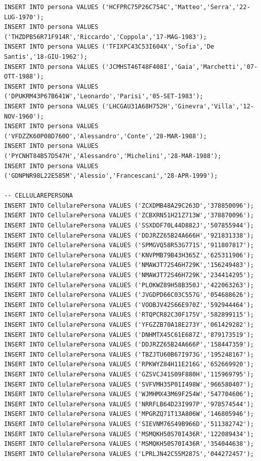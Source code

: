 \documentclass[12pt]{report}
\begin{document}
\begin{scriptsize}
\begin{verbatim}
INSERT INTO persona VALUES ('HCFPRC75P26C754C','Matteo','Serra','22-LUG-1970');
INSERT INTO persona VALUES ('THZDPB56R71F914R','Riccardo','Coppola','17-MAG-1983');
INSERT INTO persona VALUES ('TFIXPC43C53I604X','Sofia','De Santis','18-GIU-1962');
INSERT INTO persona VALUES ('JCMHST46T48F408I','Gaia','Marchetti','07-OTT-1988');
INSERT INTO persona VALUES ('DPUKRM43P67B641W','Leonardo','Parisi','05-SET-1983');
INSERT INTO persona VALUES ('LHCGAU31A68H752H','Ginevra','Villa','12-NOV-1960');
INSERT INTO persona VALUES ('VFDZZK60P08D760O','Alessandro','Conte','28-MAR-1988');
INSERT INTO persona VALUES ('PYCNHT84B57D547H','Alessandro','Michelini','28-MAR-1988');
INSERT INTO persona VALUES ('GDNPNR98L22E585M','Alessio','Francescani','28-APR-1999');

-- CELLULAREPERSONA
INSERT INTO CellularePersona VALUES ('ZCXDMB48A29C263D','378850096');
INSERT INTO CellularePersona VALUES ('ZCBXRN51H21Z713W','378870096');
INSERT INTO CellularePersona VALUES ('SSXDDF70L44D882J','507855944');
INSERT INTO CellularePersona VALUES ('DDJRZZ65B24A666H','921831338');
INSERT INTO CellularePersona VALUES ('SPMGVQ58R53G771S','911807817');
INSERT INTO CellularePersona VALUES ('KNVPMB79B43H365Z','625311906');
INSERT INTO CellularePersona VALUES ('NMAWJT72S46H729K','156249483');
INSERT INTO CellularePersona VALUES ('NMAWJT72S46H729K','234414295');
INSERT INTO CellularePersona VALUES ('PLOKWZ89H58B350J','422063263');
INSERT INTO CellularePersona VALUES ('JVGDPD66C03C557G','054688626');
INSERT INTO CellularePersona VALUES ('VOOBJV42S66E970Z','592944464');
INSERT INTO CellularePersona VALUES ('RTQPCR82C30F175V','582899115');
INSERT INTO CellularePersona VALUES ('YFGZZB70A18E273Y','061429282');
INSERT INTO CellularePersona VALUES ('DNHMTX45C61E687Z','879173519');
INSERT INTO CellularePersona VALUES ('DDJRZZ65B24A666P','158447359');
INSERT INTO CellularePersona VALUES ('TBZJTU60B67I973G','195248167');
INSERT INTO CellularePersona VALUES ('RPKWYZ84H11E216G','652669920');
INSERT INTO CellularePersona VALUES ('GZSVCJ41S09F880H','115969795');
INSERT INTO CellularePersona VALUES ('SVFVMH35P01I498W','966580407');
INSERT INTO CellularePersona VALUES ('WJMHMX43M69F254W','547704606');
INSERT INTO CellularePersona VALUES ('NRRFLB64D23I997P','978574544');
INSERT INTO CellularePersona VALUES ('MPGRZQ71T13A806W','146805946');
INSERT INTO CellularePersona VALUES ('SIEVNM76S49B966D','511382742');
INSERT INTO CellularePersona VALUES ('MSMQKH50S70I436R','122089434');
INSERT INTO CellularePersona VALUES ('MSMQKH50S70I436R','354044638');
INSERT INTO CellularePersona VALUES ('LPRLJN42C55M287S','044272457');

\end{verbatim}
\end{scriptsize}
\end{document}
